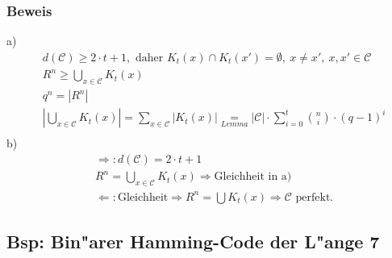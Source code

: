 \subsubsection{Beweis}
a)
\begin{align*}
	&d(\mathcal{C}) \geq 2 \cdot t + 1,\text{ daher }K_t(x) \cap K_t(x')=\emptyset,\ x\neq x',\ x,x' \in \mathcal{C}  \\
	&R^n \geq \underset{x \in \mathcal{C}}{\bigcup} K_t(x) \\
	&q^n=\left|R^n\right| \\
	&\left| \bigcup_{x \in \mathcal{C}} K_t(x) \right| = \sum_{x \in \mathcal{C}} \left| K_t(x) \right|
	\underset{Lemma}{=}\left| \mathcal{C} \right| \cdot \sum_{i=0}^t \binom{n}{i} \cdot (q-1)^i\\
\end{align*}
b)
\begin{align*}
	&\Rightarrow:d(\mathcal{C})=2 \cdot t +1 \\
	&R^n = \bigcup_{x \in \mathcal{C}} K_t(x) \Rightarrow \text{Gleichheit in a)}\\
	&\Leftarrow: \text{Gleichheit} \Rightarrow R^n=\bigcup K_t(x) \Rightarrow \mathcal{C} \text{ perfekt.}
\end{align*}

\subsection{Bsp: Bin"arer Hamming-Code der L"ange 7}

